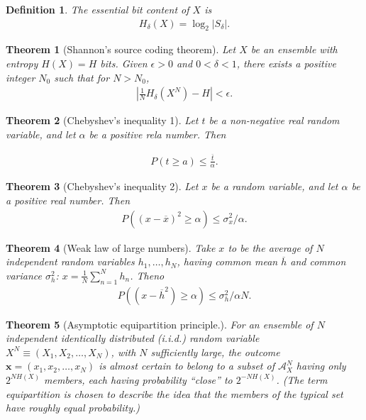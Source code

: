 \documentclass[12pt]{extarticle}
\newtheorem*{theorem}{Theorem}
\newtheorem*{definition}{Definition}
\newcommand{\ol}{\overline}
\begin{document}
\medskip

\begin{definition}
  The {essential bit content} of $X$ is
  \begin{align*}
    H_{\delta}(X) = \log_2 |S_{\delta}|.
  \end{align*}
\end{definition}

\begin{theorem}[Shannon's source coding theorem] Let $X$ be an ensemble with entropy $H(X) = H$ bits.  Given $\epsilon > 0$ and $0 < \delta < 1$, there exists a positive integer $N_0$ such that for $N > N_0$, 
  \begin{align*}
    \left | \frac{1}{N} H_{\delta} (X^N) - H \right | < \epsilon.
  \end{align*}
\end{theorem}

\begin{theorem}[Chebyshev's inequality 1] Let $t$ be a non-negative real random variable, and let $\alpha$ be a positive rela number.  Then

  \begin{align*}
    P(t \geq a) \leq \frac{\ol{t}}{\alpha}.
  \end{align*}
\end{theorem}

\begin{theorem}[Chebyshev's inequality 2]
  Let $x$ be a random variable, and let $\alpha$ be a positive real number.  Then
  \begin{align*}
    P( (x - \ol{x})^2 \geq \alpha) \leq \sigma_x^2 / \alpha.
  \end{align*}
\end{theorem}

\begin{theorem}[Weak law of large numbers] Take $x$ to be the average of $N$ independent random variables $h_1, \dots, h_N$, having common mean $\ol{h}$ and common variance $\sigma_h^2$: $x = \frac{1}{N} \sum_{n=1}^{N} h_n$.  Theno
  \begin{align*}
    P( (x - \ol{h}^2) \geq \alpha) \leq \sigma_h^2 / \alpha N.
  \end{align*}
\end{theorem}

\begin{theorem}[Asymptotic equipartition principle.] For an ensemble of $N$ independent identically distributed (i.i.d.) random variable $X^{N} \equiv (X_1, X_2, \dots, X_N)$, with $N$ sufficiently large, the outcome $\mathbf{x} = (x_1, x_2, \dots, x_N)$ is almost certain to belong to a subset of $\mathcal{A}_X^{N}$ having only $2^{NH(X)}$ members, each having probability ``close'' to $2^{-NH(X)}$.  (The term equipartition is chosen to describe the idea that the members of the typical set have roughly equal probability.)
\end{theorem}
\end{document}
